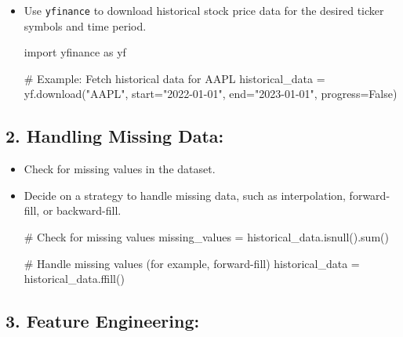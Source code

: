 \documentclass[
  letterpaper,
  DIV=11,
  numbers=noendperiod]{scrreprt}
\newenvironment{Shaded}{\begin{snugshade}}{\end{snugshade}}
\newcommand{\BuiltInTok}[1]{\textcolor[rgb]{0.00,0.23,0.31}{#1}}
\newcommand{\CommentTok}[1]{\textcolor[rgb]{0.37,0.37,0.37}{#1}}
\newcommand{\ImportTok}[1]{\textcolor[rgb]{0.00,0.46,0.62}{#1}}
\newcommand{\NormalTok}[1]{\textcolor[rgb]{0.00,0.23,0.31}{#1}}
\newcommand{\OperatorTok}[1]{\textcolor[rgb]{0.37,0.37,0.37}{#1}}
\newcommand{\StringTok}[1]{\textcolor[rgb]{0.13,0.47,0.30}{#1}}
\newcommand{\VariableTok}[1]{\textcolor[rgb]{0.07,0.07,0.07}{#1}}
\begin{document}
\begin{itemize}
\item
  Use \texttt{yfinance} to download historical stock price data for the
  desired ticker symbols and time period.

\begin{Shaded}
\begin{Highlighting}[]
\ImportTok{import}\NormalTok{ yfinance }\ImportTok{as}\NormalTok{ yf}

\CommentTok{\# Example: Fetch historical data for AAPL}
\NormalTok{historical\_data }\OperatorTok{=}\NormalTok{ yf.download(}\StringTok{"AAPL"}\NormalTok{, start}\OperatorTok{=}\StringTok{"2022{-}01{-}01"}\NormalTok{, end}\OperatorTok{=}\StringTok{"2023{-}01{-}01"}\NormalTok{, progress}\OperatorTok{=}\VariableTok{False}\NormalTok{)}
\end{Highlighting}
\end{Shaded}
\end{itemize}

\subsection{\texorpdfstring{2. \textbf{Handling Missing
Data:}}{2. Handling Missing Data:}}\label{handling-missing-data}

\begin{itemize}
\item
  Check for missing values in the dataset.
\item
  Decide on a strategy to handle missing data, such as interpolation,
  forward-fill, or backward-fill.

\begin{Shaded}
\begin{Highlighting}[]
\CommentTok{\# Check for missing values}
\NormalTok{missing\_values }\OperatorTok{=}\NormalTok{ historical\_data.isnull().}\BuiltInTok{sum}\NormalTok{()}

\CommentTok{\# Handle missing values (for example, forward{-}fill)}
\NormalTok{historical\_data }\OperatorTok{=}\NormalTok{ historical\_data.ffill()}
\end{Highlighting}
\end{Shaded}
\end{itemize}

\subsection{\texorpdfstring{3. \textbf{Feature
Engineering:}}{3. Feature Engineering:}}\label{feature-engineering}
\end{document}
